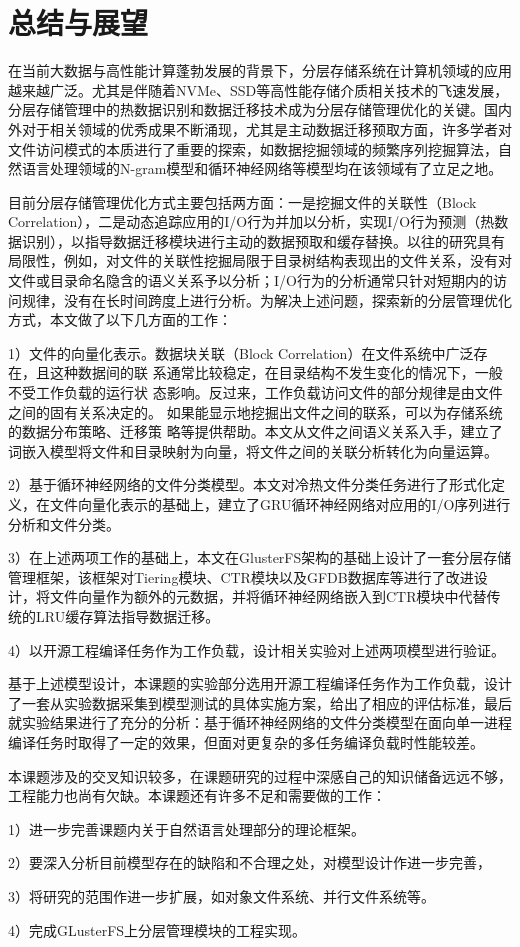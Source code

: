 \chapter{总结与展望}
在当前大数据与高性能计算蓬勃发展的背景下，分层存储系统在计算机领域的应用越来越广泛。尤其是伴随着NVMe、SSD等高性能存储介质相关技术的飞速发展，分层存储管理中的热数据识别和数据迁移技术成为分层存储管理优化的关键。国内外对于相关领域的优秀成果不断涌现，尤其是主动数据迁移预取方面，许多学者对文件访问模式的本质进行了重要的探索，如数据挖掘领域的频繁序列挖掘算法，自然语言处理领域的N-gram模型和循环神经网络等模型均在该领域有了立足之地。

目前分层存储管理优化方式主要包括两方面：一是挖掘文件的关联性（Block Correlation），二是动态追踪应用的I/O行为并加以分析，实现I/O行为预测（热数据识别），以指导数据迁移模块进行主动的数据预取和缓存替换。以往的研究具有局限性，例如，对文件的关联性挖掘局限于目录树结构表现出的文件关系，没有对文件或目录命名隐含的语义关系予以分析；I/O行为的分析通常只针对短期内的访问规律，没有在长时间跨度上进行分析。为解决上述问题，探索新的分层管理优化方式，本文做了以下几方面的工作：

1）文件的向量化表示。数据块关联（Block Correlation）在文件系统中广泛存在，且这种数据间的联 系通常比较稳定，在目录结构不发生变化的情况下，一般不受工作负载的运行状 态影响。反过来，工作负载访问文件的部分规律是由文件之间的固有关系决定的。 如果能显示地挖掘出文件之间的联系，可以为存储系统的数据分布策略、迁移策 略等提供帮助。本文从文件之间语义关系入手，建立了词嵌入模型将文件和目录映射为向量，将文件之间的关联分析转化为向量运算。

2）基于循环神经网络的文件分类模型。本文对冷热文件分类任务进行了形式化定义，在文件向量化表示的基础上，建立了GRU循环神经网络对应用的I/O序列进行分析和文件分类。

3）在上述两项工作的基础上，本文在GlusterFS架构的基础上设计了一套分层存储管理框架，该框架对Tiering模块、CTR模块以及GFDB数据库等进行了改进设计，将文件向量作为额外的元数据，并将循环神经网络嵌入到CTR模块中代替传统的LRU缓存算法指导数据迁移。

4）以开源工程编译任务作为工作负载，设计相关实验对上述两项模型进行验证。


基于上述模型设计，本课题的实验部分选用开源工程编译任务作为工作负载，设计了一套从实验数据采集到模型测试的具体实施方案，给出了相应的评估标准，最后就实验结果进行了充分的分析：基于循环神经网络的文件分类模型在面向单一进程编译任务时取得了一定的效果，但面对更复杂的多任务编译负载时性能较差。

本课题涉及的交叉知识较多，在课题研究的过程中深感自己的知识储备远远不够，工程能力也尚有欠缺。本课题还有许多不足和需要做的工作：

1）进一步完善课题内关于自然语言处理部分的理论框架。

2）要深入分析目前模型存在的缺陷和不合理之处，对模型设计作进一步完善，

3）将研究的范围作进一步扩展，如对象文件系统、并行文件系统等。

4）完成GLusterFS上分层管理模块的工程实现。